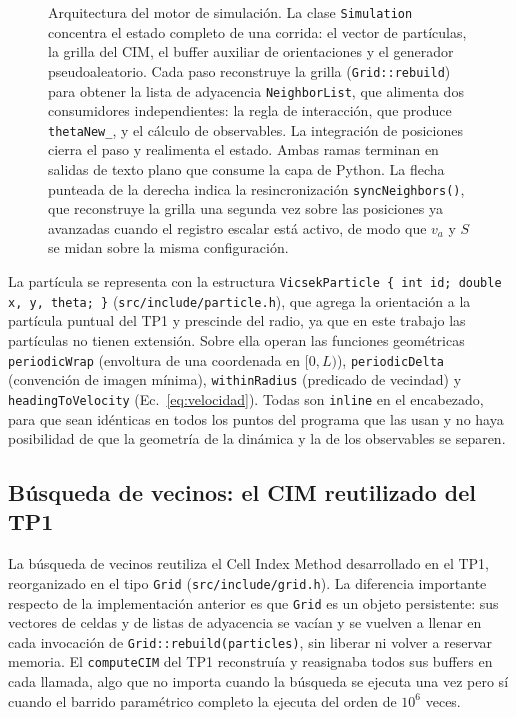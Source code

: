 \documentclass[11pt]{article}
\begin{document}
\begin{figure}[htbp]
  \centering
  \resizebox{\textwidth}{!}{}
  \caption{Arquitectura del motor de simulación. La clase \texttt{Simulation}
    concentra el estado completo de una corrida: el vector de partículas, la
    grilla del CIM, el buffer auxiliar de orientaciones y el generador
    pseudoaleatorio. Cada paso reconstruye la grilla
    (\texttt{Grid::rebuild}) para obtener la lista de adyacencia
    \texttt{NeighborList}, que alimenta dos consumidores independientes: la
    regla de interacción, que produce \texttt{thetaNew\_}, y el cálculo de
    observables. La integración de posiciones cierra el paso y realimenta el
    estado. Ambas ramas terminan en salidas de texto plano que consume la capa
    de Python. La flecha punteada de la derecha indica la resincronización
    \texttt{syncNeighbors()}, que reconstruye la grilla una segunda vez sobre
    las posiciones ya avanzadas cuando el registro escalar está activo, de modo
    que $v_a$ y $S$ se midan sobre la misma configuración.}
  \label{fig:arquitectura}
\end{figure}

La partícula se representa con la estructura
\texttt{VicsekParticle \{ int id; double x, y, theta; \}}
(\texttt{src/include/particle.h}), que agrega la orientación a la partícula
puntual del TP1 y prescinde del radio, ya que en este trabajo las partículas no
tienen extensión. Sobre ella operan las funciones geométricas
\texttt{periodicWrap} (envoltura de una coordenada en $[0,L)$),
\texttt{periodicDelta} (convención de imagen mínima), \texttt{withinRadius}
(predicado de vecindad) y \texttt{headingToVelocity}
(Ec.~\eqref{eq:velocidad}). Todas son \texttt{inline} en el encabezado, para que
sean idénticas en todos los puntos del programa que las usan y no haya
posibilidad de que la geometría de la dinámica y la de los observables se
separen.

\subsection{Búsqueda de vecinos: el CIM reutilizado del TP1}
\label{sec:cim}

La búsqueda de vecinos reutiliza el Cell Index Method desarrollado en el TP1,
reorganizado en el tipo \texttt{Grid} (\texttt{src/include/grid.h}). La
diferencia importante respecto de la implementación anterior es que
\texttt{Grid} es un objeto persistente: sus vectores de celdas y de listas de
adyacencia se vacían y se vuelven a llenar en cada invocación de
\texttt{Grid::rebuild(particles)}, sin liberar ni volver a reservar memoria. El
\texttt{computeCIM} del TP1 reconstruía y reasignaba todos sus buffers en cada
llamada, algo que no importa cuando la búsqueda se ejecuta una vez pero sí
cuando el barrido paramétrico completo la ejecuta del orden de $10^6$ veces.
\end{document}
